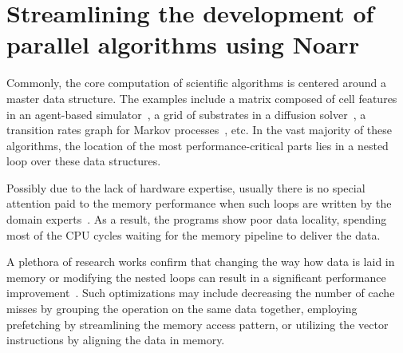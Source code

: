 \chapter{Streamlining the development of parallel algorithms using Noarr}





Commonly, the core computation of scientific algorithms is centered around a master data structure. The examples include a matrix composed of cell features in an agent-based simulator~\cite{ghaffarizadeh2018physicell}, a grid of substrates in a diffusion solver~\cite{ghaffarizadeh2016biofvm}, a transition rates graph for Markov processes~\cite{koltai2020exact}, etc. In the vast majority of these algorithms, the location of the most performance-critical parts lies in a nested loop over these data structures.

Possibly due to the lack of hardware expertise, usually there is no special attention paid to the memory performance when such loops are written by the domain experts~\cite{clauss2000automatic}. As a result, the programs show poor data locality, spending most of the CPU cycles waiting for the memory pipeline to deliver the data. 

A plethora of research works confirm that changing the way how data is laid in memory or modifying the nested loops can result in a significant performance improvement~\cite{gong2018empirical,stengel2015quantifying,serpa2019memory}. Such optimizations may include decreasing the number of cache misses by grouping the operation on the same data together, employing prefetching by streamlining the memory access pattern, or utilizing the vector instructions by aligning the data in memory.

